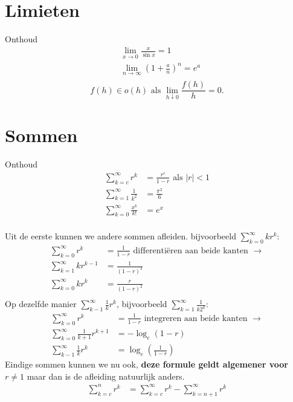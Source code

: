 \documentclass{article}
\begin{document}
    \tableofcontents
    \newpage

    \section{Limieten}\label{sec:limieten}
    Onthoud
    \begin{align*}
        &\lim_{x\to 0} \frac{x}{\sin x} = 1 \\
        &\lim_{n \to \infty} \left( 1 + \frac a n \right)^n = e^a \\
    \end{align*}
    \[
        f(h) \in o(h) \text{ als } \lim_{h \downarrow 0} \frac{f(h)}{h} = 0.
    \]
    \section{Sommen}\label{sec:sommen}
    Onthoud
    \begin{align*}
        \sum_{k=c}^{\infty} r^k &= \frac{r^c}{1-r} \text{ als $|r|<1$}\\
        \sum_{k=1}^{\infty} \frac{1}{k^2} &= \frac{\pi^2}{6} \\
        \sum_{k=0}^\infty \frac{x^k}{k!} &= e^x \\
    \end{align*}

    Uit de eerste kunnen we andere sommen afleiden.
    bijvoorbeeld
    $\displaystyle \sum_{k=0}^{\infty} kr^k: $
    \begin{align*}
        \sum_{k=0}^{\infty} r^k &= \frac{1}{1-r} \text { differenti\"eren aan beide kanten } \to \\
        \sum_{k=1}^{\infty} kr^{k-1} &= \frac{1}{(1-r)^2} \\
        \sum_{k=0}^{\infty} kr^k &= \frac{r}{(1-r)^2} \\
    \end{align*}
    Op dezelfde manier $\displaystyle \sum_{k-1}^\infty \frac{1}{k} r^k$, bijvoorbeeld $\displaystyle \sum_{k=1}^{\infty} \frac{1}{k2^k}$:
    \begin{align*}
        \sum_{k=0}^{\infty} r^k &= \frac{1}{1-r} \text { integreren aan beide kanten } \to \\
        \sum_{k=0}^{\infty} \frac{1}{k+1} r^{k+1} &= -\log_e (1-r) \\
        \sum_{k-1}^\infty \frac{1}{k} r^k &= \log_e (\frac{1}{1-r})
    \end{align*}
    Eindige sommen kunnen we nu ook, \textbf{deze formule geldt algemener voor $r\neq 1$} maar dan is de afleiding natuurlijk anders.
    \begin{align*}
        \sum_{k=c}^n r^k &= \sum_{k=c}^\infty r^k - \sum_{k=n+1}^\infty r^k
    \end{align*}
\end{document}
